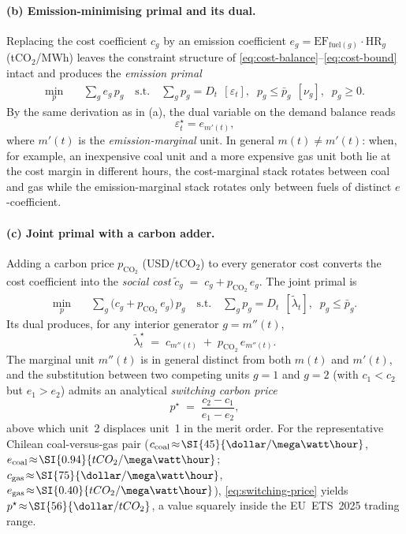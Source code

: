 \paragraph{(b) Emission-minimising primal and its dual.}
Replacing the cost coefficient $c_g$ by an emission coefficient
$e_g\!=\!\mathrm{EF}_{\mathrm{fuel}(g)}\!\cdot\!\mathrm{HR}_g$
(tCO$_2$/MWh) leaves the constraint structure of
\eqref{eq:cost-balance}--\eqref{eq:cost-bound} intact and produces the
\emph{emission primal}
\begin{align}
  \min_{p}
    \quad & \sum_{g} e_g\, p_g
    \quad
    \text{s.t.}\quad
    \sum_{g} p_g = D_t \;\,[\varepsilon_t],\;\;
    p_g \le \bar p_g \;\,[\nu_g],\;\;
    p_g \ge 0.
        \label{eq:emis-primal}
\end{align}
By the same derivation as in (a), the dual variable on the demand
balance reads
\begin{equation}
  \varepsilon_t^\star = e_{m'(t)},
  \label{eq:eps-equals-em}
\end{equation}
where $m'(t)$ is the \emph{emission-marginal} unit.  In general
$m(t)\neq m'(t)$: when, for example, an inexpensive coal unit and a
more expensive gas unit both lie at the cost margin in different
hours, the cost-marginal stack rotates between coal and gas while
the emission-marginal stack rotates only between fuels of distinct
$e$-coefficient.

\paragraph{(c) Joint primal with a carbon adder.}
Adding a carbon price $p_{\mathrm{CO}_2}$ (USD/tCO$_2$) to every
generator cost converts the cost coefficient into the
\emph{social cost}
$\tilde c_g \;=\; c_g + p_{\mathrm{CO}_2}\,e_g$.
The joint primal is
\begin{align}
  \min_{p}
  \quad & \sum_{g} \big(c_g + p_{\mathrm{CO}_2}\, e_g\big)\, p_g
    \quad
  \text{s.t.}\quad
  \sum_g p_g = D_t \;\,[\tilde\lambda_t],\;\;
  p_g \le \bar p_g.
  \label{eq:joint-primal}
\end{align}
Its dual produces, for any interior generator $g\!=\!m''(t)$,
\begin{equation}
  \tilde\lambda_t^\star
    \;=\; c_{m''(t)} \;+\; p_{\mathrm{CO}_2}\, e_{m''(t)}.
  \label{eq:joint-lambda}
\end{equation}
The marginal unit $m''(t)$ is in general distinct from both $m(t)$
and $m'(t)$, and the substitution between two competing units
$g\!=\!1$ and $g\!=\!2$ (with $c_1<c_2$ but $e_1>e_2$) admits an
analytical \emph{switching carbon price}
\begin{equation}
  p^\star \;=\; \frac{c_2 - c_1}{e_1 - e_2},
  \label{eq:switching-price}
\end{equation}
above which unit~2 displaces unit~1 in the merit order.  For the
representative Chilean coal-versus-gas pair
($c_{\rm coal}\!\approx\!\SI{45}{\dollar/\mega\watt\hour}$,
$e_{\rm coal}\!\approx\!\SI{0.94}{tCO_2/\mega\watt\hour}$;
$c_{\rm gas}\!\approx\!\SI{75}{\dollar/\mega\watt\hour}$,
$e_{\rm gas}\!\approx\!\SI{0.40}{tCO_2/\mega\watt\hour}$),
\eqref{eq:switching-price} yields
$p^\star\!\approx\!\SI{56}{\dollar/tCO_2}$, a value squarely inside
the EU~ETS~2025 trading range.

